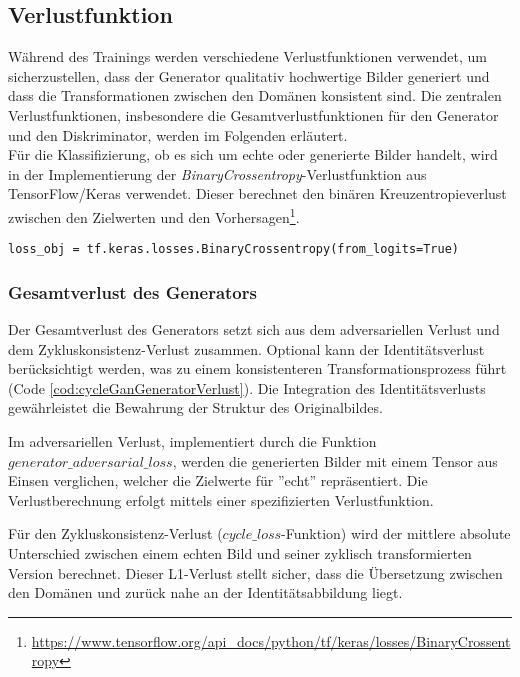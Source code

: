 \newpage
\subsection{Verlustfunktion}
Während des Trainings werden verschiedene Verlustfunktionen verwendet, um sicherzustellen, dass der Generator qualitativ hochwertige Bilder generiert und dass die Transformationen zwischen den Domänen konsistent sind. Die zentralen Verlustfunktionen, insbesondere die Gesamtverlustfunktionen für den Generator und den Diskriminator, werden im Folgenden erläutert. 
\\
Für die Klassifizierung, ob es sich um echte oder generierte Bilder handelt, wird in der Implementierung der \textit{BinaryCrossentropy}-Verlustfunktion aus TensorFlow/Keras verwendet. 
Dieser berechnet den binären Kreuzentropieverlust zwischen den Zielwerten und den Vorhersagen\footnote{\url{https://www.tensorflow.org/api_docs/python/tf/keras/losses/BinaryCrossentropy}}.

\begin{lstlisting}[language=pyhaff, caption={Initialisierung des BinaryCrossentropy-\\Verlustfunktion}, label={cod:binaryCrossentropy}]
loss_obj = tf.keras.losses.BinaryCrossentropy(from_logits=True)
\end{lstlisting}


\subsubsection{Gesamtverlust des Generators}
Der Gesamtverlust des Generators setzt sich aus dem adversariellen Verlust und dem Zykluskonsistenz-Verlust zusammen. Optional kann der Identitätsverlust berücksichtigt werden, was zu einem konsistenteren Transformationsprozess führt (Code \ref{cod:cycleGanGeneratorVerlust}). Die Integration des Identitätsverlusts gewährleistet die Bewahrung der Struktur des Originalbildes.

Im adversariellen Verlust, implementiert durch die Funktion \\$generator\_adversarial\_loss$, werden die generierten Bilder mit einem Tensor aus Einsen verglichen, welcher die Zielwerte für ''echt'' repräsentiert. Die Verlustberechnung erfolgt mittels einer spezifizierten Verlustfunktion.

Für den Zykluskonsistenz-Verlust ($cycle\_loss$-Funktion) wird der mittlere absolute Unterschied zwischen einem echten Bild und seiner zyklisch transformierten Version berechnet. Dieser L1-Verlust stellt sicher, dass die Übersetzung zwischen den Domänen und zurück nahe an der Identitätsabbildung liegt.

